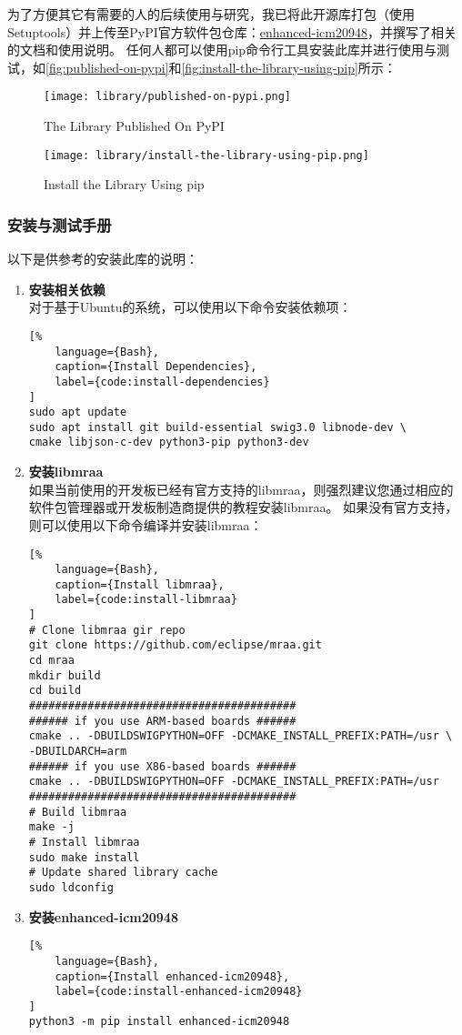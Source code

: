 为了方便其它有需要的人的后续使用与研究，我已将此开源库打包（使用Setuptools）并上传至PyPI官方软件包仓库：\href{https://pypi.org/project/enhanced-icm20948/}{enhanced-icm20948}，并撰写了相关的文档和使用说明。
任何人都可以使用pip命令行工具安装此库并进行使用与测试，如\autoref{fig:published-on-pypi}和\autoref{fig:install-the-library-using-pip}所示：

\begin{figure}[H]
    \centering
    \texttt{[image: library/published-on-pypi.png]}
    \caption{\label{fig:published-on-pypi}The Library Published On PyPI}
\end{figure}

\begin{figure}[H]
    \centering
    \texttt{[image: library/install-the-library-using-pip.png]}
    \caption{\label{fig:install-the-library-using-pip}Install the Library Using pip}
\end{figure}

\subsubsection{安装与测试手册}
以下是供参考的安装此库的说明：

\begin{enumerate}
    \item {\bfseries 安装相关依赖} \\
对于基于Ubuntu的系统，可以使用以下命令安装依赖项：
\begin{lstlisting}[%
    language={Bash},
    caption={Install Dependencies},
    label={code:install-dependencies}
]
sudo apt update
sudo apt install git build-essential swig3.0 libnode-dev \ 
cmake libjson-c-dev python3-pip python3-dev
\end{lstlisting}
    \item {\bfseries 安装libmraa} \\
如果当前使用的开发板已经有官方支持的libmraa，则强烈建议您通过相应的软件包管理器或开发板制造商提供的教程安装libmraa。
如果没有官方支持，则可以使用以下命令编译并安装libmraa：
\begin{lstlisting}[%
    language={Bash},
    caption={Install libmraa},
    label={code:install-libmraa}
]
# Clone libmraa gir repo
git clone https://github.com/eclipse/mraa.git
cd mraa
mkdir build
cd build
#########################################
###### if you use ARM-based boards ######
cmake .. -DBUILDSWIGPYTHON=OFF -DCMAKE_INSTALL_PREFIX:PATH=/usr \ 
-DBUILDARCH=arm
###### if you use X86-based boards ######
cmake .. -DBUILDSWIGPYTHON=OFF -DCMAKE_INSTALL_PREFIX:PATH=/usr
#########################################
# Build libmraa
make -j
# Install libmraa
sudo make install
# Update shared library cache
sudo ldconfig
\end{lstlisting}
    \item {\bfseries 安装enhanced-icm20948} \\
\begin{lstlisting}[%
    language={Bash},
    caption={Install enhanced-icm20948},
    label={code:install-enhanced-icm20948}
]
python3 -m pip install enhanced-icm20948
\end{lstlisting}
\end{enumerate}

